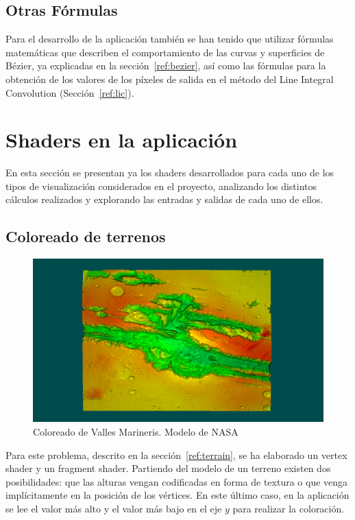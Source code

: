 \subsection{Otras Fórmulas}
\label{makereference5.4.4}

Para el desarrollo de la aplicación también se han tenido que utilizar fórmulas
matemáticas que describen el comportamiento de las curvas y superficies de
Bézier, ya explicadas en la sección~\ref{ref:bezier}, así como las
fórmulas para la obtención de los valores de los píxeles de salida en el método
del Line Integral Convolution (Sección~\ref{ref:lic}).

\section{Shaders en la aplicación}
\label{makereference5.5}

En esta sección se presentan ya los shaders desarrollados para cada uno de los
tipos de visualización considerados en el proyecto, analizando los distintos
cálculos realizados y explorando las entradas y salidas de cada uno de ellos.

\subsection{Coloreado de terrenos}
\label{makereference5.5.1}

\begin{figure}
	\centering
	\includegraphics[width=\textwidth]{figures/myterrain.png}
	\caption{Coloreado de Valles Marineris. Modelo de NASA~\cite{NASA}}
	\label{fig:myterrain}
\end{figure}

Para este problema, descrito en la sección~\ref{ref:terrain}, se ha elaborado un
vertex shader y un fragment shader. Partiendo del modelo de un terreno existen
dos posibilidades: que las alturas vengan codificadas en forma de textura o que
venga implícitamente en la posición de los vértices. En este último caso, en la
aplicación se lee el valor más alto y el valor más bajo en el eje $y$ para
realizar la coloración. \\

